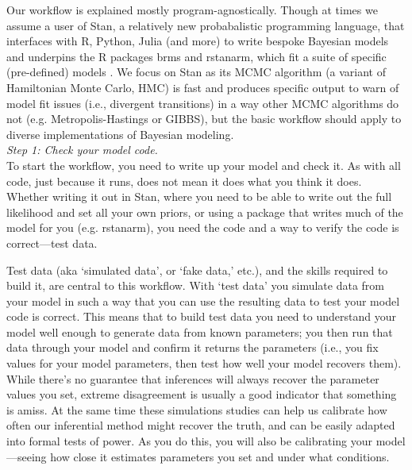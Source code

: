 \documentclass[11pt]{article}
\begin{document}
{Our workflow is explained mostly program-agnostically. Though at times we assume a user of \textsf{Stan}, a relatively new probabalistic programming language, that interfaces with \textsf{R, Python, Julia} (and more) to write bespoke Bayesian models and underpins the \textsf{R} packages \textsf{brms} and \textsf{rstanarm}, which fit a suite of specific (pre-defined) models \citep{Carpenter:2017stan}. We focus on \textsf{Stan} as its MCMC algorithm (a variant of Hamiltonian Monte Carlo, HMC) is fast and produces specific output to warn of model fit issues (i.e., divergent transitions) in a way other MCMC algorithms do not (e.g. Metropolis-Hastings or GIBBS), but the basic workflow should apply to diverse implementations of Bayesian modeling. \\

\emph{Step 1: Check your model code.} \\ 
To start the workflow, you need to write up your model and check it. As with all code, just because it runs, does not mean it does what you think it does. Whether writing it out in \textsf{Stan}, where you need to be able to write out the full likelihood and set all your own priors, or using a package that writes much of the model for you (e.g. \textsf{rstanarm}), you need the code and a way to verify the code is correct---test data.

Test data (aka `simulated data', or  `fake data,' etc.), and the skills required to build it, are central to this workflow. With `test data' you simulate data from your model in such a way that you can use the resulting data to test your model code is correct. This means that to build test data you need to understand your model well enough to generate data from known parameters; you then run that data through your model and confirm it returns the parameters (i.e., you fix values for your model parameters, then test how well your model recovers them). While there's no guarantee that inferences will always recover the parameter values you set, extreme disagreement is usually a good indicator that something is amiss. At the same time these simulations studies can help us calibrate how often our inferential method might recover the truth, and can be easily adapted into formal tests of power. As you do this, you will also be calibrating your model---seeing how close it estimates parameters you set and under what conditions. %


}
\end{document}
